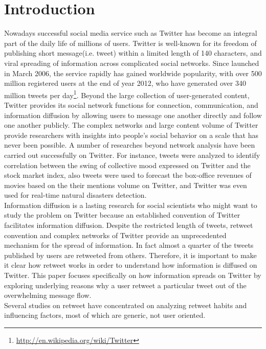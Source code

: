 \documentclass{acm_proc_article-sp}
\begin{document}
\section{Introduction}
Nowadays  successful social media service such as Twitter has become an integral part of the daily life of millions of users. 
Twitter is well-known for its freedom of publishing short message(i.e. tweet) within a limited length of 140 characters, and viral spreading of information across complicated social networks.
Since launched in March 2006, the service rapidly has gained worldwide popularity, with over 500 million registered users at the end of year 2012, who have generated over 340 million tweets per day\footnote{\url{http://en.wikipedia.org/wiki/Twitter}}.
Beyond the large collection of user-generated content, Twitter provides its social network functions for connection, communication, and information diffusion by allowing users to message one another directly and follow one another publicly. 
The complex networks and large content volume of Twitter provide researchers with insights into people’s social behavior on a scale that has never been possible\cite{DBLP:conf/hicss/StieglitzD12}.
A number of researches beyond network analysis\cite{Kwak:2010TSN} have been carried out successfully on Twitter. 
For instance, tweets were analyzed to identify correlation between the swing of collective mood expressed on Twitter and the stock market index\cite{journals/jocs/BollenMZ11}, also tweets were used to forecast the box-office revenues of movies based 
on the their mentions volume on Twitter\cite{Asur:2010PFS}, and Twitter was even used for real-time natural disasters detection\cite{Sakaki:2010EST}.\\
Information diffusion is a lasting research for social scientists who might want to study the problem on Twitter because an established convention of Twitter facilitates information diffusion. 
Despite the restricted length of tweets, retweet convention and complex networks of Twitter provide an unprecedented mechanism for the spread of information\cite{Jenders:2013APV}. 
In fact almost a quarter of the tweets published by users are retweeted from others\cite{conf/cikm/YangGCTLZS10}. 
Therefore, it is important to make it clear how retweet works in order to understand how information is diffused on Twitter. 
This paper focuses specifically on how information spreads on Twitter by exploring underlying reasons why a user retweet a particular tweet out of the overwhelming message flow.\\ 
Several studies on retweet have concentrated on analyzing retweet habits and influencing factors\cite{Boyd2010,Kwak:2010TSN,Suh2010}, most of which are generic, not user oriented.
\end{document}
